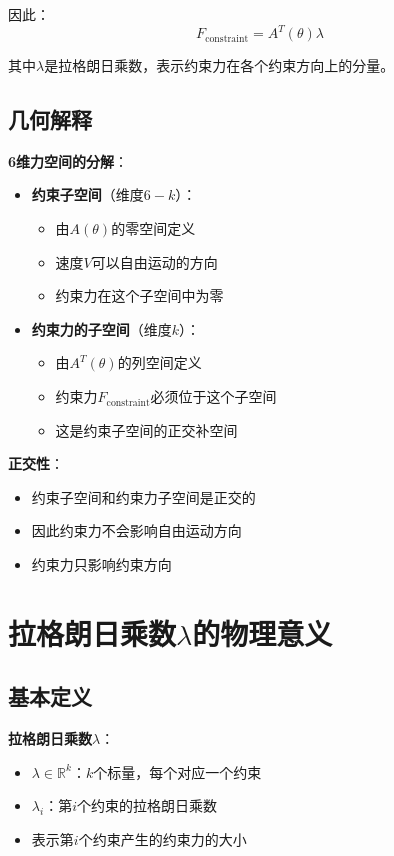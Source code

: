 \documentclass[12pt,a4paper]{article}
\begin{document}
因此：
\begin{equation}
F_{\text{constraint}} = A^T(\theta)\lambda
\end{equation}

其中$\lambda$是拉格朗日乘数，表示约束力在各个约束方向上的分量。

\subsection{几何解释}

\textbf{6维力空间的分解}：

\begin{itemize}
\item \textbf{约束子空间}（维度$6-k$）：
\begin{itemize}
\item 由$A(\theta)$的零空间定义
\item 速度$V$可以自由运动的方向
\item 约束力在这个子空间中为零
\end{itemize}

\item \textbf{约束力的子空间}（维度$k$）：
\begin{itemize}
\item 由$A^T(\theta)$的列空间定义
\item 约束力$F_{\text{constraint}}$必须位于这个子空间
\item 这是约束子空间的正交补空间
\end{itemize}
\end{itemize}

\textbf{正交性}：
\begin{itemize}
\item 约束子空间和约束力子空间是正交的
\item 因此约束力不会影响自由运动方向
\item 约束力只影响约束方向
\end{itemize}

\section{拉格朗日乘数$\lambda$的物理意义}

\subsection{基本定义}

\textbf{拉格朗日乘数$\lambda$}：
\begin{itemize}
\item $\lambda \in \mathbb{R}^k$：$k$个标量，每个对应一个约束
\item $\lambda_i$：第$i$个约束的拉格朗日乘数
\item 表示第$i$个约束产生的约束力的大小
\end{itemize}
\end{document}
